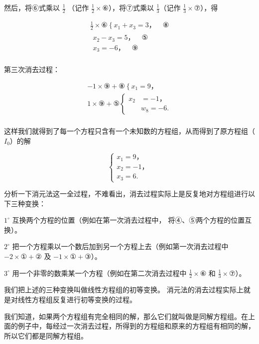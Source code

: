 然后，将⑥式乘以 \(\frac{1}{2}\) （记作
\(\frac{1}{2} \times ⑥\)），将⑦式乘以 \(\frac{1}{3}\)（记作
\(\frac{1}{3} \times ⑦\)），得

\[
\begin{array}{l} \frac {1}{2} \times ⑥ \left\{x _ {1} + x _ {3} = 3\text{，} \quad ⑧ \right. \\ \left. \begin{array}{c} x _ {2} - x _ {3} = 5\text{，} \quad ⑤ \\ x _ {3} = - 6\text{，} \quad ⑨ \end{array} \right. \tag {II} \\ \end{array}
\]

第三次消去过程：

\[
\begin{array}{l} - 1 \times ⑨ + ⑧ \left\{x _ {1} = 9\text{，} \right. \\ 1 \times ⑨ + ⑤ \left\{ \begin{array}{ll} x _ {2} & = - 1\text{，} \\ & w _ {8} = - 6. \end{array} \right. \tag {III} \\ \end{array}
\]

这样我们就得到了每一个方程只含有一个未知数的方程组，从而得到了原方程组（\(I_{0}\)）的解

\[
\left\{ \begin{array}{l} x _ {1} = 9\text{，} \\ x _ {2} = - 1\text{，} \\ x _ {3} = 6. \end{array} \right.
\]

分析一下消元法这一全过程，不难看出，消去过程实际上是反复地对方程组进行以下三种变换：

\(1^{\circ}\) 互换两个方程的位置（例如在第一次消去过程中，
将④、⑤两个方程的位置互换）。

\(2^{\circ}\)
把一个方程乘以一个数后加到另一个方程上去（例如第一次消去过程中
\(-2 \times ① + ②\) 及 \(-1 \times ① + ③\)）。

\(3^{\circ}\) 用一个非零的数乘某一个方程（例如在第二次消去过程中
\(\frac{1}{2} \times ⑥\) 和 \(\frac{1}{3} \times ⑦\)）。

我们把上述的三种变换叫做线性方程组的初等变换。
消元法的消去过程实际上就是对线性方程组反复进行初等变换的过程。

我们知道，如果两个方程组有完全相同的解，那么它们就叫做是同解方程组。在上面的例子中，每经过一次消去过程，所得到的方程组和原来的方程组有相同的解，所以它们都是同解方程组。

